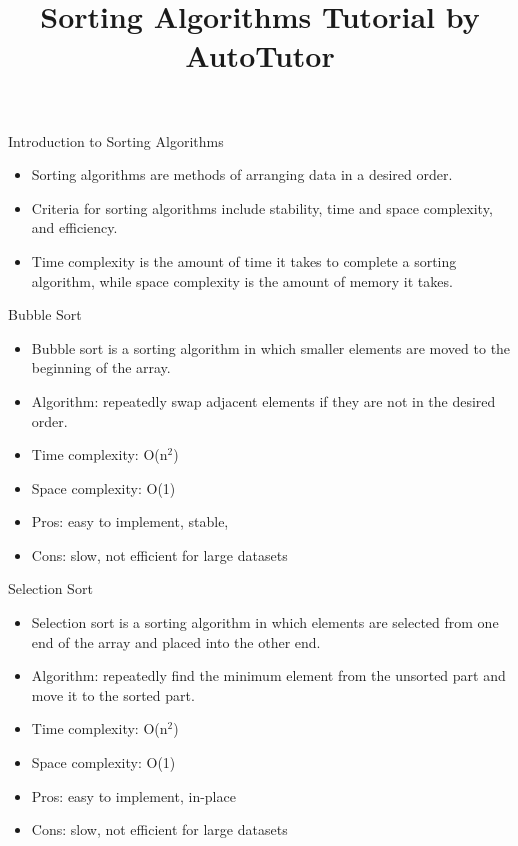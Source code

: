 \documentclass{beamer}
\title{Sorting Algorithms Tutorial by AutoTutor}
\begin{document}
\begin{frame}
\titlepage
\end{frame}

\begin{frame}{Introduction to Sorting Algorithms}
\begin{itemize}
    \item Sorting algorithms are methods of arranging data in a desired order.
    \item Criteria for sorting algorithms include stability, time and space complexity, and efficiency. 
    \item Time complexity is the amount of time it takes to complete a sorting algorithm, while space complexity is the amount of memory it takes. 
\end{itemize}
\end{frame}

\begin{frame}{Bubble Sort}
\begin{itemize}
    \item Bubble sort is a sorting algorithm in which smaller elements are moved to the beginning of the array. 
    \item Algorithm: repeatedly swap adjacent elements if they are not in the desired order. 
    \item Time complexity: O(n$^2$) 
    \item Space complexity: O(1) 
    \item Pros: easy to implement, stable, 
    \item Cons: slow, not efficient for large datasets 
\end{itemize}
\end{frame}

\begin{frame}{Selection Sort}
\begin{itemize}
    \item Selection sort is a sorting algorithm in which elements are selected from one end of the array and placed into the other end. 
    \item Algorithm: repeatedly find the minimum element from the unsorted part and move it to the sorted part. 
    \item Time complexity: O(n$^2$) 
    \item Space complexity: O(1) 
    \item Pros: easy to implement, in-place
    \item Cons: slow, not efficient for large datasets 
\end{itemize}
\end{frame}
\end{document}
